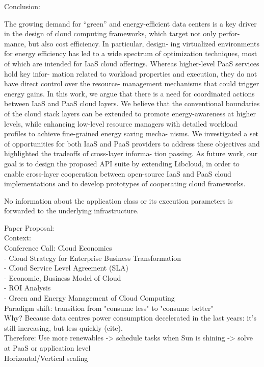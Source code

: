 Conclusion:

The growing demand for “green” and energy-efficient
data centers is a key driver in the design of cloud
computing frameworks, which target not only perfor-
mance, but also cost efficiency. In particular, design-
ing virtualized environments for energy efficiency has
led to a wide spectrum of optimization techniques,
most of which are intended for IaaS cloud offerings.
Whereas higher-level PaaS services hold key infor-
mation related to workload properties and execution,
they do not have direct control over the resource-
management mechanisms that could trigger energy
gains. In this work, we argue that there is a need
for coordinated actions between IaaS and PaaS cloud
layers. We believe that the conventional boundaries
of the cloud stack layers can be extended to promote
energy-awareness at higher levels, while enhancing
low-level resource managers with detailed workload
profiles to achieve fine-grained energy saving mecha-
nisms.
We investigated a set of opportunities for both
IaaS and PaaS providers to address these objectives
and highlighted the tradeoffs of cross-layer informa-
tion passing. As future work, our goal is to design the
proposed API suite by extending Libcloud, in order to
enable cross-layer cooperation between open-source
IaaS and PaaS cloud implementations and to develop
prototypes of cooperating cloud frameworks.

No information about the application class or its execution parameters is forwarded to the underlying infrastructure.


Paper Proposal: \\
Context: \\
  Conference Call: Cloud Economics \\
- Cloud Strategy for Enterprise Business Transformation \\
- Cloud Service Level Agreement (SLA) \\
- Economic, Business Model of Cloud \\
- ROI Analysis \\
- Green and Energy Management of Cloud Computing \\

Paradigm shift: transition from "consume less" to "consume better" \\
Why? Because data centres power consumption decelerated in the last years: it's still increasing, but less quickly (cite). \\

Therefore: Use more renewables -> schedule tasks when Sun is shining -> solve at PaaS or application level \\
Horizontal/Vertical scaling \\

